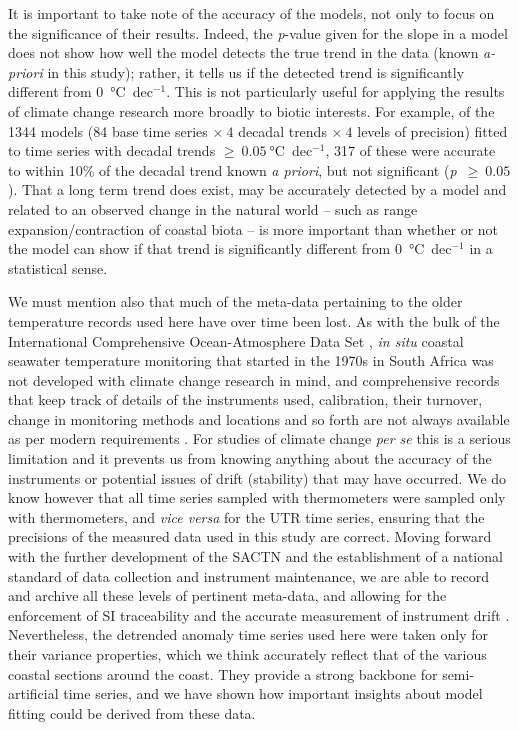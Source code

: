 \documentclass[]{ametsoc}
\begin{document}
It is important to take note of the accuracy of the models, not only to focus on the significance of their results. Indeed, the \emph{p}-value given for the slope in a model does not show how well the model detects the true trend in the data (known \emph{a-priori} in this study); rather, it tells us if the detected trend is significantly different from \SI{0}{\degreeCelsius}~dec$^{-1}$. This is not particularly useful for applying the results of climate change research more broadly to biotic interests. For example, of the 1344 models (84 base time series $\times~4$ decadal trends $\times~4$ levels of precision) fitted to time series with decadal trends $\geq~\SI{0.05}{\degreeCelsius}$~dec$^{-1}$, 317 of these  were accurate to within 10\% of the decadal trend known \emph{a priori}, but not significant (\emph{p}~$\geq~0.05$). That a long term trend does exist, may be accurately detected by a model and related to an observed change in the natural world -- such as range expansion/contraction of coastal biota \citep{Bolton2012,Straub2016,Wernberg2016} -- is more important than whether or not the model can show if that trend is significantly different from \SI{0}{\degreeCelsius}~dec$^{-1}$ in a statistical sense.

We must mention also that much of the meta-data pertaining to the older temperature records used here have over time been lost. As with the bulk of the International Comprehensive Ocean-Atmosphere Data Set \citep[ICOADS;][]{Freeman:2016db}, \emph{in situ} coastal seawater temperature monitoring that started in the 1970s in South Africa was not developed with climate change research in mind, and comprehensive records that keep track of details of the instruments used, calibration, their turnover, change in monitoring methods and locations and so forth are not always available as per modern requirements \citep{Aguilar2003}. For studies of climate change \emph{per se} this is a serious limitation and it prevents us from knowing anything about the accuracy of the instruments or potential issues of drift (stability) that may have occurred. We do know however that all time series sampled with thermometers were sampled only with thermometers, and \emph{vice versa} for the UTR time series, ensuring that the precisions of the measured data used in this study are correct. Moving forward with the further development of the SACTN and the establishment of a national standard of data collection and instrument maintenance, we are able to record and archive all these levels of pertinent meta-data, and allowing for the enforcement of SI traceability and the accurate measurement of instrument drift \citep{Jarraud2008}. Nevertheless, the detrended anomaly time series used here were taken only for their variance properties, which we think accurately reflect that of the various coastal sections around the coast. They provide a strong backbone for semi-artificial time series, and we have shown how important insights about model fitting could be derived from these data.
\end{document}
